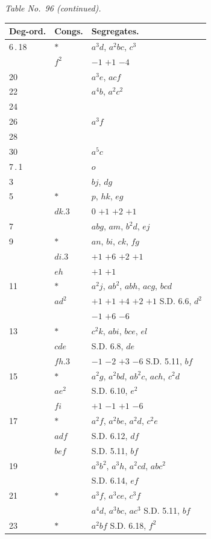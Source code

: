 \documentclass[11pt]{article}
\begin{document}

\begin{center}
\textit{Table No.\ 96 (continued).}
\end{center}

\begin{center}
\begin{tabular}{lll}
Deg-ord. & Congs. & Segregates. \\
\hline
6\,.\,18 & $*$ & $a^{3}d$, $a^{2}bc$, $c^{3}$ \\
& $f^{2}$ & $-1$ $+1$ $-4$ \\
20 & & $a^{3}e$, $acf$ \\
22 & & $a^{4}b$, $a^{2}c^{2}$ \\
24 & & \\
26 & & $a^{3}f$ \\
28 & & \\
30 & & $a^{5}c$ \\
\hline
7\,.\,1 & & $o$ \\
3 & & $bj$, $dg$ \\
5 & $*$ & $p$, $hk$, $eg$ \\
& $dk.3$ & $0$ $+1$ $+2$ $+1$ \\
7 & & $abg$, $am$, $b^{2}d$, $ej$ \\
9 & $*$ & $an$, $bi$, $ck$, $fg$ \\
& $di.3$ & $+1$ $+6$ $+2$ $+1$ \\
& $eh$ & $+1$ $+1$ \\
11 & $*$ & $a^{2}j$, $ab^{2}$, $abh$, $acg$, $bcd$ \\
& $ad^{2}$ & $+1$ $+1$ $+4$ $+2$ $+1$ \quad S.D. 6.6, $d^{2}$ \\
& & $-1$ $+6$ $-6$ \\
13 & $*$ & $c^{2}k$, $abi$, $bce$, $el$ \\
& $cde$ & \quad\quad\quad\quad\quad\quad S.D. 6.8, $de$ \\
& $fh.3$ & $-1$ $-2$ $+3$ $-6$ \quad\quad S.D. 5.11, $bf$ \\
15 & $*$ & $a^{2}g$, $a^{2}bd$, $ab^{2}c$, $ach$, $c^{2}d$ \\
& $ae^{2}$ & \quad\quad\quad\quad\quad\quad S.D. 6.10, $e^{2}$ \\
& $fi$ & $+1$ $-1$ $+1$ $-6$ \\
17 & $*$ & $a^{2}f$, $a^{2}be$, $a^{2}d$, $c^{2}e$ \\
& $adf$ & \quad\quad\quad\quad\quad\quad S.D. 6.12, $df$ \\
& $bef$ & \quad\quad\quad\quad\quad\quad S.D. 5.11, $bf$ \\
19 & & $a^{3}b^{2}$, $a^{3}h$, $a^{2}cd$, $abc^{2}$ \\
& & \quad\quad\quad\quad\quad\quad S.D. 6.14, $ef$ \\
21 & $*$ & $a^{3}f$, $a^{3}ce$, $c^{3}f$ \\
& & $a^{4}d$, $a^{3}bc$, $ac^{3}$ \quad\quad S.D. 5.11, $bf$ \\
23 & $*$ & $a^{2}bf$ \quad\quad\quad\quad\quad\quad S.D. 6.18, $f^{2}$ \\
\end{tabular}
\end{center}
\end{document}
